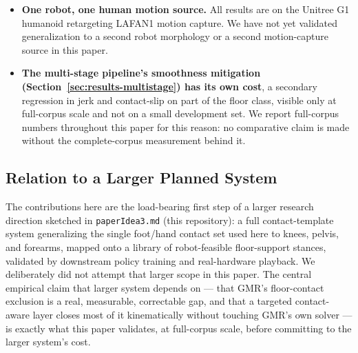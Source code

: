 \begin{itemize}
    (Sections~\ref{sec:global} and~\ref{sec:results-global}) is a step
    toward one.
  \item \textbf{One robot, one human motion source.} All results are on
    the Unitree G1 humanoid retargeting LAFAN1 motion capture. We have not
    yet validated generalization to a second robot morphology or a second
    motion-capture source in this paper.
  \item \textbf{The multi-stage pipeline's smoothness mitigation
    (Section~\ref{sec:results-multistage}) has its own cost}, a secondary
    regression in jerk and contact-slip on part of the floor class, visible
    only at full-corpus scale and not on a small development set. We
    report full-corpus numbers throughout this paper for this reason: no
    comparative claim is made without the complete-corpus measurement
    behind it.
\end{itemize}

\subsection{Relation to a Larger Planned System}
\label{sec:larger-system}

The contributions here are the load-bearing first step of a larger
research direction sketched in \texttt{paperIdea3.md} (this repository): a
full contact-template system generalizing the single foot/hand contact set
used here to knees, pelvis, and forearms, mapped onto a library of
robot-feasible floor-support stances, validated by downstream policy
training and real-hardware playback. We deliberately did not attempt that
larger scope in this paper. The central empirical claim that larger system
depends on --- that GMR's floor-contact exclusion is a real, measurable,
correctable gap, and that a targeted contact-aware layer closes most of it
kinematically without touching GMR's own solver --- is exactly what this
paper validates, at full-corpus scale, before committing to the larger
system's cost.
